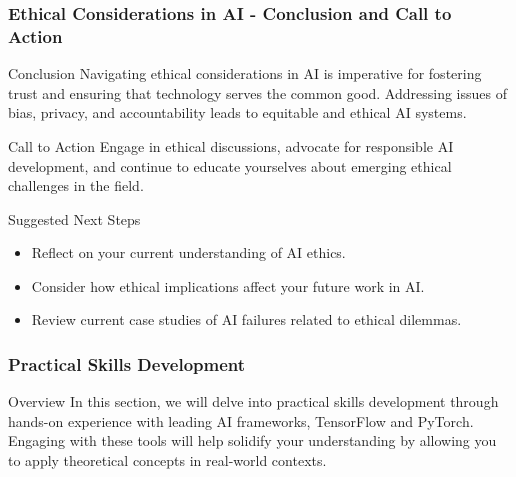 \documentclass[aspectratio=169]{beamer}
\begin{document}
\begin{frame}[fragile]
    \frametitle{Ethical Considerations in AI - Conclusion and Call to Action}
    \begin{block}{Conclusion}
        Navigating ethical considerations in AI is imperative for fostering trust and ensuring that technology serves the common good. Addressing issues of bias, privacy, and accountability leads to equitable and ethical AI systems.
    \end{block}
    
    \begin{block}{Call to Action}
        Engage in ethical discussions, advocate for responsible AI development, and continue to educate yourselves about emerging ethical challenges in the field.
    \end{block}
    
    \begin{block}{Suggested Next Steps}
        \begin{itemize}
            \item Reflect on your current understanding of AI ethics.
            \item Consider how ethical implications affect your future work in AI.
            \item Review current case studies of AI failures related to ethical dilemmas.
        \end{itemize}
    \end{block}
\end{frame}

\begin{frame}
    \frametitle{Practical Skills Development}
    \begin{block}{Overview}
        In this section, we will delve into practical skills development through hands-on experience with leading AI frameworks, TensorFlow and PyTorch. Engaging with these tools will help solidify your understanding by allowing you to apply theoretical concepts in real-world contexts.
    \end{block}
\end{frame}
\end{document}
